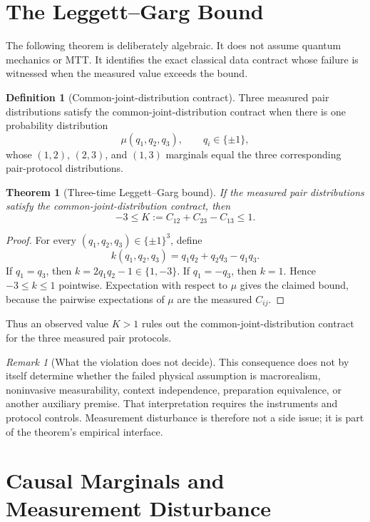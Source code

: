 \documentclass[11pt]{article}
\newtheorem{theorem}{Theorem}
\theoremstyle{definition}
\newtheorem{definition}{Definition}
\theoremstyle{remark}
\newtheorem{remark}{Remark}
\begin{document}
\section{The Leggett--Garg Bound}

The following theorem is deliberately algebraic.  It does not assume quantum
mechanics or MTT.  It identifies the exact classical data contract whose
failure is witnessed when the measured value exceeds the bound.

\begin{definition}[Common-joint-distribution contract]
Three measured pair distributions satisfy the common-joint-distribution
contract when there is one probability distribution
\[
 \mu(q_1,q_2,q_3),\qquad q_i\in\{\pm1\},
\]
whose $(1,2)$, $(2,3)$, and $(1,3)$ marginals equal the three corresponding
pair-protocol distributions.
\end{definition}

\begin{theorem}[Three-time Leggett--Garg bound]
\label{thm:lgi}
If the measured pair distributions satisfy the common-joint-distribution
contract, then
\[
 -3\leq K:=C_{12}+C_{23}-C_{13}\leq1.
\]
\end{theorem}

\begin{proof}
For every $(q_1,q_2,q_3)\in\{\pm1\}^3$, define
\[
 k(q_1,q_2,q_3)=q_1q_2+q_2q_3-q_1q_3.
\]
If $q_1=q_3$, then $k=2q_1q_2-1\in\{1,-3\}$.  If
$q_1=-q_3$, then $k=1$.  Hence $-3\leq k\leq1$ pointwise.
Expectation with respect to $\mu$ gives the claimed bound, because the
pairwise expectations of $\mu$ are the measured $C_{ij}$.
\end{proof}

Thus an observed value $K>1$ rules out the common-joint-distribution contract
for the three measured pair protocols.

\begin{remark}[What the violation does not decide]
This consequence does not by itself determine whether the failed physical
assumption is macrorealism, noninvasive measurability, context independence,
preparation equivalence, or another auxiliary premise.  That interpretation
requires the instruments and protocol controls.  Measurement disturbance is
therefore not a side issue; it is part of the theorem's empirical interface.
\end{remark}

\section{Causal Marginals and Measurement Disturbance}
\end{document}
